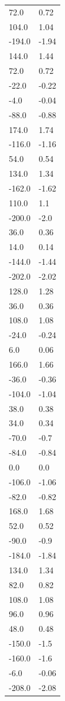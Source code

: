 \begin{longtable}{ll}
72.0 & 0.72 \\
104.0 & 1.04 \\
-194.0 & -1.94 \\
144.0 & 1.44 \\
72.0 & 0.72 \\
-22.0 & -0.22 \\
-4.0 & -0.04 \\
-88.0 & -0.88 \\
174.0 & 1.74 \\
-116.0 & -1.16 \\
54.0 & 0.54 \\
134.0 & 1.34 \\
-162.0 & -1.62 \\
110.0 & 1.1 \\
-200.0 & -2.0 \\
36.0 & 0.36 \\
14.0 & 0.14 \\
-144.0 & -1.44 \\
-202.0 & -2.02 \\
128.0 & 1.28 \\
36.0 & 0.36 \\
108.0 & 1.08 \\
-24.0 & -0.24 \\
6.0 & 0.06 \\
166.0 & 1.66 \\
-36.0 & -0.36 \\
-104.0 & -1.04 \\
38.0 & 0.38 \\
34.0 & 0.34 \\
-70.0 & -0.7 \\
-84.0 & -0.84 \\
0.0 & 0.0 \\
-106.0 & -1.06 \\
-82.0 & -0.82 \\
168.0 & 1.68 \\
52.0 & 0.52 \\
-90.0 & -0.9 \\
-184.0 & -1.84 \\
134.0 & 1.34 \\
82.0 & 0.82 \\
108.0 & 1.08 \\
96.0 & 0.96 \\
48.0 & 0.48 \\
-150.0 & -1.5 \\
-160.0 & -1.6 \\
-6.0 & -0.06 \\
-208.0 & -2.08 \\

\end{longtable}
